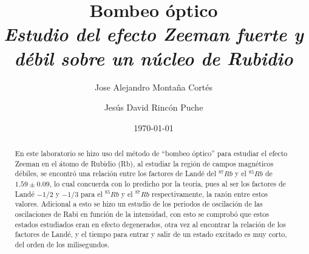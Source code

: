 \documentclass[%
 reprint,
 amsmath,amssymb,
 aps,
]{revtex4-1}
\newcommand{\subtitle}[1]{%
\posttitle{%
    \par\end{center}
\begin{center}\large#1\end{center}
\vskip0.5em}%
}
\begin{document}

\title{Bombeo óptico\\ \textit{Estudio del efecto Zeeman fuerte y débil sobre un núcleo de Rubidio } }%


\author{Jose Alejandro Montaña Cortés}
\author{Jesús David Rincón Puche}%
%


\date{\today}%

\begin{abstract}
En este laboratorio se hizo uso del método de ``bombeo óptico'' para estudiar el efecto Zeeman en el átomo de Rubidio (Rb), al estudiar la región de campos magnéticos débiles, se encontró una relación entre los factores de Landé del $^{87}Rb$ y el $^{85}Rb$ de  $1.59\pm  0.09$, lo cual concuerda con lo predicho por la teoría, pues al ser los factores de Landé $-1/2$ y $-1/3$ para el $^{85}Rb$ y el $^{87}Rb$ respectivamente, la razón entre estos valores. Adicional a esto se hizo un estudio de los periodos de oscilación de las oscilaciones de Rabi en función de la intensidad, con esto se comprobó que estos estados estudiados eran en efecto degenerados, otra vez al encontrar la relación de los factores de Landé, y el tiempo para entrar y salir de un estado excitado es muy corto, del orden de los milisegundos.


\end{abstract}
\maketitle

\end{document}
